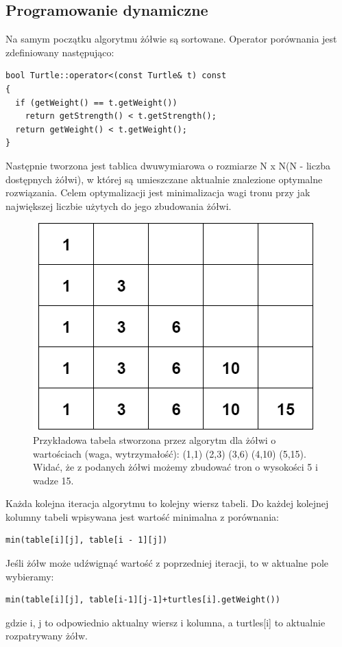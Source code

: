 \documentclass[11pt,a4paper]{article}
\begin{document}
\subsection{Programowanie dynamiczne}
Na samym początku algorytmu żółwie są sortowane. Operator porównania jest zdefiniowany następująco:
\begin{lstlisting}
bool Turtle::operator<(const Turtle& t) const
{
  if (getWeight() == t.getWeight())
    return getStrength() < t.getStrength();
  return getWeight() < t.getWeight();
}
\end{lstlisting}
Następnie tworzona jest tablica dwuwymiarowa o rozmiarze N x N(N - liczba dostępnych żółwi), w której są umieszczane aktualnie znalezione optymalne rozwiązania. Celem optymalizacji jest minimalizacja wagi tronu przy jak największej liczbie użytych do jego zbudowania żółwi.
\begin{figure}[h]
  \centering
  \includegraphics[scale=0.5]{table.png}
  \caption{Przykładowa tabela stworzona przez algorytm dla żółwi o wartościach (waga, wytrzymałość): (1,1) (2,3) (3,6) (4,10) (5,15). 
Widać, że z podanych żółwi możemy zbudować tron o wysokości 5 i wadze 15. }
  \label{fig:table1}
\end{figure}

Każda kolejna iteracja algorytmu to kolejny wiersz tabeli. Do każdej kolejnej kolumny tabeli wpisywana jest wartość minimalna z porównania:
\begin{lstlisting}
min(table[i][j], table[i - 1][j])
\end{lstlisting}
Jeśli żółw może udźwignąć wartość z poprzedniej iteracji, to w aktualne pole wybieramy: 
\begin{lstlisting}
min(table[i][j], table[i-1][j-1]+turtles[i].getWeight())
\end{lstlisting}
gdzie i, j to odpowiednio aktualny wiersz i kolumna, a turtles[i] to aktualnie rozpatrywany żółw.
\end{document}
